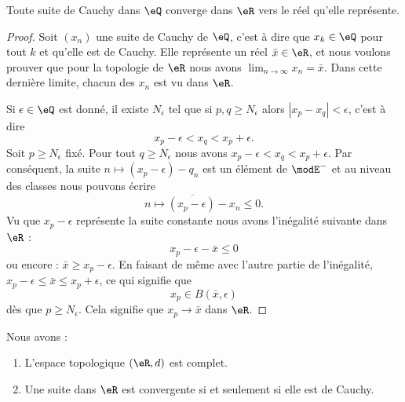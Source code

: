 \begin{lemma}      \label{LemooRTGFooYVstwS}
    Toute suite de Cauchy dans \( \eQ\) converge dans \( \eR\) vers le réel qu'elle représente.
\end{lemma}

\begin{proof}
    Soit \( (x_n)\) une suite de Cauchy de \( \eQ\), c'est à dire que \( x_k\in \eQ\) pour tout \( k\) et qu'elle est de Cauchy. Elle représente un réel \( \bar x\in \eR\), et nous voulons prouver que pour la topologie de \( \eR\) nous avons \( \lim_{n\to \infty} x_n=\bar x\). Dans cette dernière limite, chacun des \( x_n\) est vu dans \( \eR\).

    Si \( \epsilon\in \eQ\) est donné, il existe \( N_{\epsilon}\) tel que si \( p,q\geq N_{\epsilon}\) alors \( | x_p-x_q |< \epsilon\), c'est à dire
    \begin{equation}
        x_p-\epsilon<x_q<x_p+\epsilon.
    \end{equation}
    Soit \( p\geq N_{\epsilon}\) fixé. Pour tout \( q\geq N_{\epsilon}\) nous avons \(  x_p-\epsilon<x_q<x_p+\epsilon \). Par conséquent, la suite \( n\mapsto (x_p-\epsilon)-q_n\) est un élément de \( \modE^-\) et au niveau des classes nous pouvons écrire
    \begin{equation}
        \overline{ n\mapsto (x_p-\epsilon)-x_n }\leq 0.
    \end{equation}
    Vu que \( x_p-\epsilon\) représente la suite constante nous avons l'inégalité suivante dans \( \eR\) :
    \begin{equation}
        x_p-\epsilon-\bar x\leq 0
    \end{equation}
    ou encore : \( \bar x\geq x_p-\epsilon\). En faisant de même avec l'autre partie de l'inégalité, \( x_p-\epsilon\leq \bar x\leq x_p+\epsilon\), ce qui signifie que
    \begin{equation}
        x_p\in B(\bar x,\epsilon)
    \end{equation}
    dès que \( p\geq N_{\epsilon}\). Cela signifie que \( x_p\to \bar x\) dans \( \eR\).
\end{proof}

\begin{theorem} \label{ThoTFGioqS}
    Nous avons :
    \begin{enumerate}
        \item
            L'espace topologique \( (\eR,d)\) est complet.
        \item
            Une suite dans \( \eR\) est convergente si et seulement si elle est de Cauchy.
    \end{enumerate}
\end{theorem}

